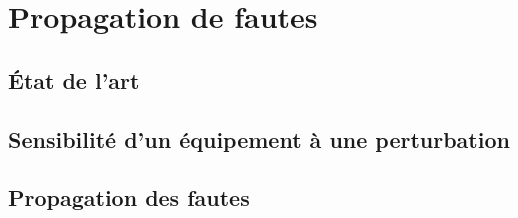 \section{Propagation de fautes}
\label{sec:contribution_sdf-tr_propagation}

\subsection{\'Etat de l'art}
\subsection{Sensibilité d'un équipement à une perturbation}
\subsection{Propagation des fautes}


